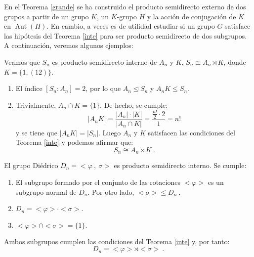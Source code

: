 \begin{remark}
En el Teorema \ref{grande} se ha construido el producto semidirecto externo de dos grupos a partir de un grupo $K$, un $K$-grupo $H$ y la acción de conjugación de $K$ en $\operatorname{Aut}(H)$. En cambio, a veces es de utilidad estudiar si un grupo $G$ satisface las hipótesis del Teorema \ref{inte} para ser producto semidirecto de dos subgrupos. 
A continuación, veremos algunos ejemplos:

\end{remark}


\newpage
\begin{Ejemplo} \label{SnAn}
Veamos que $S_n$ es producto semidirecto interno de $A_n$ y $K$, $S_n \cong A_n \rtimes K$, donde $K=\{ 1, (12)\}$.
\begin{enumerate}
    \setlength\itemsep{0.1em}
    \item El índice $[S_n:A_n]=2$, por lo que $A_n \trianglelefteq S_n$ y $A_n K \leq S_n$.
    \item Trivialmente, $A_n \cap K = \{1\}$. De hecho, se cumple:
    \[
        |A_n K| = \frac{|A_n| \cdot |K|}{|A_n \cap K|} = \frac{\frac{n!}{2}\cdot 2}{1} = n! 
    \]
    y se tiene que $|A_nK| = |S_n|$. \; Luego $A_n$ y $K$ satisfacen las condiciones del Teorema \ref{inte} y podemos afirmar que:
    \[
         S_n \cong A_n \rtimes K \: .
    \]
\end{enumerate}
\end{Ejemplo}



\begin{Ejemplo} \label{dnrs}
El grupo Diédrico $D_n =<\varphi \:, \: \sigma> $ es producto semidirecto interno. Se cumple:
\begin{enumerate}
    \setlength\itemsep{0.1em}
    \item El subgrupo formado por el conjunto de las rotaciones $< \varphi>$  es un subgrupo normal de $D_n$. Por otro lado, $< \sigma> \leq D_n \:$.
    \item $D_n =<\varphi>\cdot<\sigma> $.
    \item $<\varphi> \cap <\sigma> = \{1\}.$
\end{enumerate} 
Ambos subgrupos cumplen las condiciones del Teorema \ref{inte} y, por tanto:
\[
    D_n = <\varphi> \rtimes <\sigma> \: .
\]
\end{Ejemplo}



